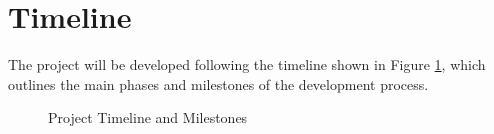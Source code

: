 \documentclass[a4paper,twoside,11pt]{article}
\begin{document}
\section*{Timeline}
The project will be developed following the timeline shown in Figure \ref{fig:project-plan}, which outlines the main phases and milestones of the development process.
\begin{figure}[h]
	\begin{center}
	\end{center}
	\caption{Project Timeline and Milestones}\label{fig:project-plan}
\end{figure}


\end{document}
